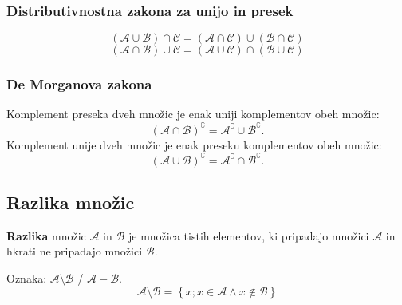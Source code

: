                 \subsubsection{Distributivnostna zakona za unijo in presek}
        $$ \left(\mathcal{A}\cup\mathcal{B}\right)\cap\mathcal{C}=\left(\mathcal{A}\cap\mathcal{C}\right)\cup\left(\mathcal{B}\cap\mathcal{C}\right) $$
        $$ \left(\mathcal{A}\cap\mathcal{B}\right)\cup\mathcal{C}=\left(\mathcal{A}\cup\mathcal{C}\right)\cap\left(\mathcal{B}\cup\mathcal{C}\right) $$
    

        \subsubsection{De Morganova zakona}
        Komplement preseka dveh množic je enak uniji komplementov obeh množic:
        $$\left(\mathcal{A}\cap\mathcal{B}\right)^\complement=\mathcal{A}^\complement\cup\mathcal{B}^\complement. $$
        Komplement unije dveh množic je enak preseku komplementov obeh množic:
        $$\left(\mathcal{A}\cup\mathcal{B}\right)^\complement=\mathcal{A}^\complement\cap\mathcal{B}^\complement. $$
    



    
    

            \subsection{Razlika množic}
                \textbf{Razlika} množic $\mathcal{A}$ in $\mathcal{B}$ je množica tistih elementov, ki  
                pripadajo množici $\mathcal{A}$ in hkrati ne pripadajo množici $\mathcal{B}$.

                Oznaka: $\mathbf{\mathcal{A}\setminus\mathcal{B}}$ / $\mathbf{\mathcal{A}-\mathcal{B}}$.
                $$ \mathcal{A}\setminus\mathcal{B}=\left\{x; x\in\mathcal{A}\land x\notin\mathcal{B}\right\} $$
            

            
            


